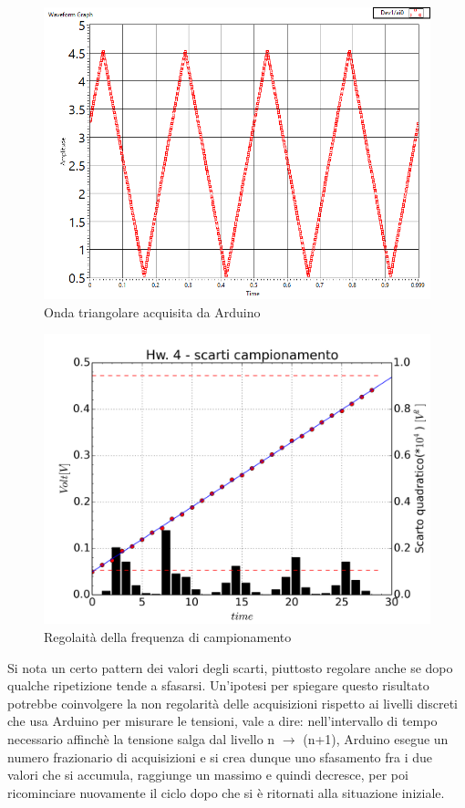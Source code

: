 \documentclass[journal, a4paper]{IEEEtran}
\begin{document}
\begin{figure}
\centering
\includegraphics[width=0.9\linewidth]{./es14_triang}
\caption{Onda triangolare acquisita da Arduino}
\label{fig:es14_triang}
\end{figure}
 
 
 \begin{figure}
\centering
\includegraphics[width=0.9\linewidth]{./hw3_triang}
\caption{Regolaità della frequenza di campionamento}
\label{fig:hw3_triang}
\end{figure}

Si nota un certo pattern dei valori degli scarti, piuttosto regolare anche se dopo qualche ripetizione tende a sfasarsi. Un'ipotesi per spiegare questo risultato potrebbe coinvolgere la non regolarità delle acquisizioni rispetto ai livelli discreti che usa Arduino per misurare le tensioni, vale a dire: nell'intervallo di tempo necessario affinchè la tensione salga dal livello n $\rightarrow$ (n+1), Arduino esegue un numero frazionario di acquisizioni e si crea dunque uno sfasamento fra i due valori che si accumula, raggiunge un massimo e quindi decresce, per poi ricominciare nuovamente il ciclo dopo che si è ritornati alla situazione iniziale.
\end{document}
